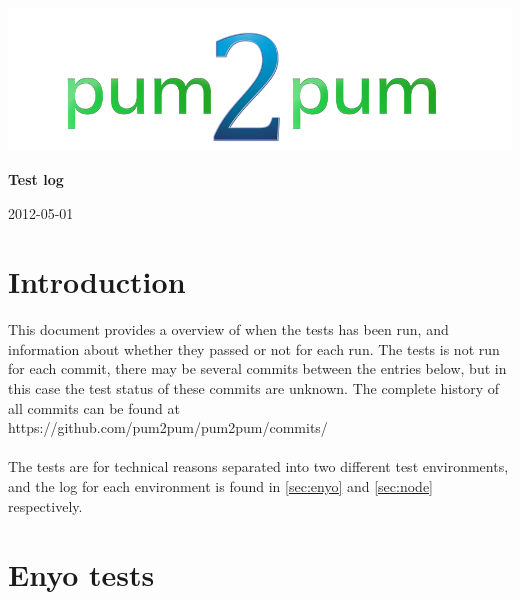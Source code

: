 \documentclass[a4paper, 12pt, titlepage]{article}
\begin{document}
	
	\begin{titlepage}
		
		\includegraphics[scale=0.4]{logoNormal.png}
		
		\vspace{6cm}
		
		\begin{center}
			\Huge{\textbf{Test log}} %
			
			\vspace{0.5cm}
			
			\huge{2012-05-01} %
		\end{center}
		
	\end{titlepage}
	
	\newpage


	\section{Introduction}
	This document provides a overview of when the tests has been run, and  information about whether they passed or not for each run. The tests is not run for each commit, there may be several commits between the entries below, but in this case the test status of these commits are unknown. The complete history of all commits can be found at\\

	https://github.com/pum2pum/pum2pum/commits/\\\\
	The tests are for technical reasons separated into two different test environments, and the log for each environment is found in \autoref{sec:enyo} and \autoref{sec:node} respectively.\\


	\section{Enyo tests}
	\label{sec:enyo}
\end{document}
